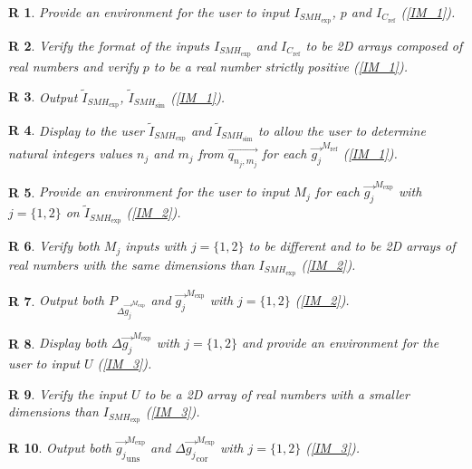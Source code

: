 \documentclass[12pt]{article}
\newtheorem{R}{R}
\begin{document}
\begin{R}
\label{R_1}
\normalfont Provide an environment for the user to input $I_{\mathit{SMH}_{\text{exp}}}$, $p$ and $I_{C_{\text{ref}}}$ (\cref{IM_1}).
\end{R}
\begin{R}
\label{R_2}
\normalfont Verify the format of the inputs $I_{\mathit{SMH}_{\text{exp}}}$ and $I_{C_{\text{ref}}}$ to be 2D arrays composed of real numbers and verify $p$ to be a real number strictly positive (\cref{IM_1}).
\end{R}
\begin{R}
\label{R_3}
\normalfont Output $\widetilde{I}_{\mathit{SMH}_{\text{exp}}}$, $\widetilde{I}_{\mathit{SMH}_{\text{sim}}}$ (\cref{IM_1}).
\end{R}
\begin{R}
\label{R_4}
\normalfont Display to the user $\widetilde{I}_{\mathit{SMH}_{\text{exp}}}$ and $\widetilde{I}_{\mathit{SMH}_{\text{sim}}}$ to allow the user to determine natural integers values $n_j$ and $m_j$ from $\overrightarrow{q_{n_j,m_j}}$ for each $\overrightarrow{g_j}^{M_{\text{ref}}}$ (\cref{IM_1}).
\end{R}
\begin{R}
\label{R_5}
\normalfont Provide an environment for the user to input $M_j$ for each $\overrightarrow{g_{j}}^{M_{\text{exp}}}$ with $j=\{1,2\}$ on $\widetilde{I}_{\mathit{SMH}_{\text{exp}}}$ (\cref{IM_2}).
\end{R}
\begin{R}
\label{R_6}
\normalfont Verify both $M_j$ inputs with $j=\{1,2\}$ to be different and to be 2D arrays of real numbers with the same dimensions than $I_{\mathit{SMH}_{\text{exp}}}$ (\cref{IM_2}).
\end{R}
\begin{R}
\label{R_7}
\normalfont Output both $P_{\Delta \overrightarrow{g_{j}}^{M_{\text{exp}}}}$ and $\overrightarrow{g_{j}}^{M_{\text{exp}}}$ with $j=\{1,2\}$ (\cref{IM_2}).
\end{R}
\begin{R}
\label{R_8}
\normalfont Display both $\Delta \overrightarrow{g_{j}}^{M_{\text{exp}}}$  with $j=\{1,2\}$ and provide an environment for the user to input $U$ (\cref{IM_3}).
\end{R}
\begin{R}
\label{R_9}
\normalfont Verify the input $U$ to be a 2D array of real numbers with a smaller dimensions than $I_{\mathit{SMH}_{\text{exp}}}$ (\cref{IM_3}).
\end{R}
\begin{R}
\label{R_10}
\normalfont Output both $\overrightarrow{g_{j}}_{\text{uns}}^{M_{\text{exp}}}$ and $\Delta\overrightarrow{g_{j}}_{\text{cor}}^{M_{\text{exp}}}$ with $j=\{1,2\}$ (\cref{IM_3}).
\end{R}
\end{document}
